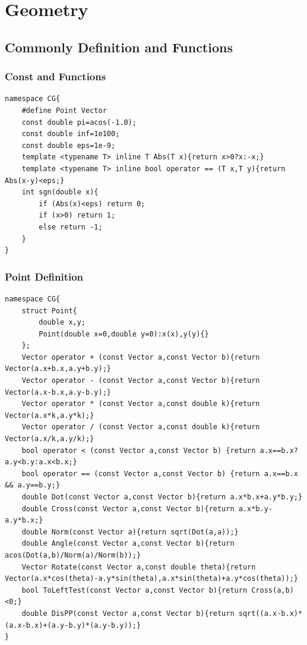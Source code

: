 \documentclass[10pt]{ctexart}
\begin{document}
{\newpage
\section{Geometry}
\subsection{Commonly Definition and Functions}
\subsubsection{Const and Functions}
\begin{lstlisting}
namespace CG{
    #define Point Vector
    const double pi=acos(-1.0);
    const double inf=1e100;
    const double eps=1e-9;
    template <typename T> inline T Abs(T x){return x>0?x:-x;}
    template <typename T> inline bool operator == (T x,T y){return Abs(x-y)<eps;}
    int sgn(double x){
        if (Abs(x)<eps) return 0;
        if (x>0) return 1;
        else return -1;
    }
}
\end{lstlisting}
\subsubsection{Point Definition}
\begin{lstlisting}
namespace CG{
    struct Point{
        double x,y;
        Point(double x=0,double y=0):x(x),y(y){}
    };
    Vector operator + (const Vector a,const Vector b){return Vector(a.x+b.x,a.y+b.y);}
    Vector operator - (const Vector a,const Vector b){return Vector(a.x-b.x,a.y-b.y);}
    Vector operator * (const Vector a,const double k){return Vector(a.x*k,a.y*k);}
    Vector operator / (const Vector a,const double k){return Vector(a.x/k,a.y/k);}
    bool operator < (const Vector a,const Vector b) {return a.x==b.x?a.y<b.y:a.x<b.x;}
    bool operator == (const Vector a,const Vector b) {return a.x==b.x && a.y==b.y;}
    double Dot(const Vector a,const Vector b){return a.x*b.x+a.y*b.y;}
    double Cross(const Vector a,const Vector b){return a.x*b.y-a.y*b.x;}    
    double Norm(const Vector a){return sqrt(Dot(a,a));}
    double Angle(const Vector a,const Vector b){return acos(Dot(a,b)/Norm(a)/Norm(b));}
    Vector Rotate(const Vector a,const double theta){return Vector(a.x*cos(theta)-a.y*sin(theta),a.x*sin(theta)+a.y*cos(theta));}
    bool ToLeftTest(const Vector a,const Vector b){return Cross(a,b)<0;}
    double DisPP(const Vector a,const Vector b){return sqrt((a.x-b.x)*(a.x-b.x)+(a.y-b.y)*(a.y-b.y));}
}
\end{lstlisting}
}
\end{document}
